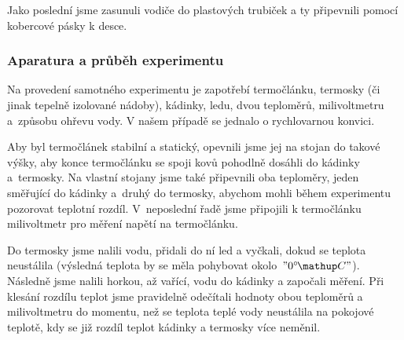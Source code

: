 Jako poslední jsme zasunuli vodiče do plastových trubiček a ty připevnili
pomocí kobercové pásky k desce.

\subsubsection{Aparatura a průběh experimentu}
Na provedení samotného experimentu je zapotřebí termočlánku, termosky (či jinak
tepelně izolované nádoby), kádinky, ledu, dvou teploměrů, milivoltmetru
a~způsobu ohřevu vody. V našem případě se jednalo o rychlovarnou konvici.

Aby byl termočlánek stabilní a statický, opevnili jsme jej na stojan do takové
výšky, aby konce termočlánku se spoji kovů pohodlně dosáhli do kádinky
a~termosky. Na vlastní stojany jsme také připevnili oba teploměry, jeden
směřující do kádinky a~druhý do termosky, abychom mohli během experimentu
pozorovat teplotní rozdíl. V~neposlední řadě jsme připojili k termočlánku
milivoltmetr pro měření napětí na termočlánku. 

Do termosky jsme nalili vodu, přidali do ní led a vyčkali, dokud se teplota
neustálila (výsledná teplota by se měla pohybovat okolo~$"0\C"$). Následně jsme
nalili horkou, až vařící, vodu do kádinky a započali měření. Při klesání
rozdílu teplot jsme pravidelně odečítali hodnoty obou teploměrů a milivoltmetru
do momentu, než se teplota teplé vody neustálila na pokojové teplotě, kdy se
již rozdíl teplot kádinky a termosky více neměnil.
